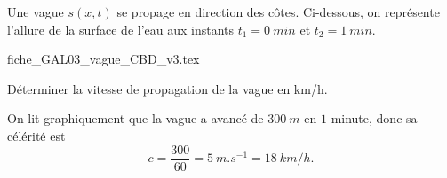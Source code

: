 

\finEntrainement





\newpage



\hauteurLargeurCadreReponse		{8mm}{4cm}
\initialisationEntrainement

Une vague $s(x,t)$ se propage en direction des côtes. Ci-dessous, on représente l'allure de la surface de l'eau aux instants $t_1=\SI{0}{min}$ et $t_2=\SI{1}{min}$.

\begin{center}
{fiche_GAL03_vague_CBD_v3.tex}
\end{center}

\debutEntrainement



\begin{enonce}
Déterminer la vitesse de propagation de la vague en \si{km/h}.
\end{enonce}


\begin{corrige}
On lit graphiquement que la vague a avancé de $\SI{300}{m}$ en $1$ minute, donc sa célérité est 
\[
c=\dfrac{300}{60} = \SI{5}{m.s^{-1}}=\SI{18}{km/h}.
\]
\end{corrige}

